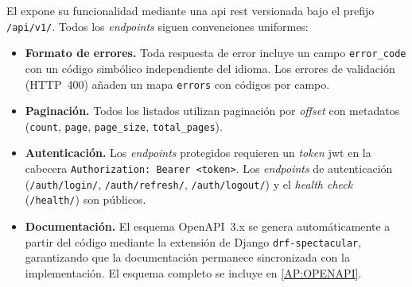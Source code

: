 El  expone su funcionalidad mediante una \acs{api}
\acs{rest} versionada bajo el prefijo \texttt{/api/v1/}. Todos los
\textit{endpoints} siguen convenciones uniformes:

\begin{itemize}
  \item \textbf{Formato de errores.} Toda respuesta de error incluye un
  campo \texttt{error\_code} con un código simbólico independiente del
  idioma. Los errores de validación (HTTP~400) añaden un mapa
  \texttt{errors} con códigos por campo.

  \item \textbf{Paginación.} Todos los listados utilizan paginación por
  \textit{offset} con metadatos (\texttt{count}, \texttt{page},
  \texttt{page\_size}, \texttt{total\_pages}).

  \item \textbf{Autenticación.} Los \textit{endpoints} protegidos
  requieren un \textit{token} \acs{jwt} en la cabecera
  \texttt{Authorization: Bearer <token>}. Los \textit{endpoints} de
  autenticación (\texttt{/auth/login/}, \texttt{/auth/refresh/},
  \texttt{/auth/logout/}) y el \textit{health check}
  (\texttt{/health/}) son públicos.

  \item \textbf{Documentación.} El esquema OpenAPI~3.x se genera
  automáticamente a partir del código mediante la extensión de Django
  \texttt{drf-spectacular},
  garantizando que la documentación permanece sincronizada con la
  implementación. El esquema completo se incluye en
  \cref{AP:OPENAPI}.
\end{itemize}
